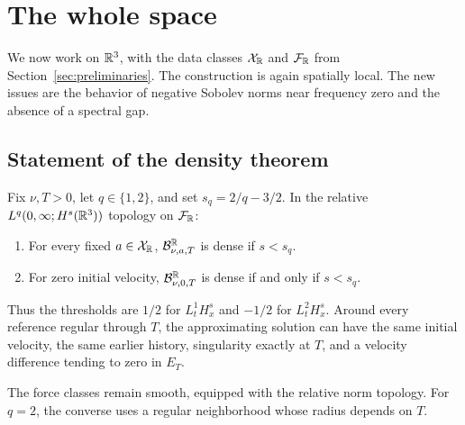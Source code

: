 \section{The whole space}\label{sec:whole}
We now work on $\mathbb R^3$, with the data classes $\mathcal X_{\mathbb R}$ and
$\mathcal F_{\mathbb R}$ from Section~\ref{sec:preliminaries}. The construction
is again spatially local. The new issues are the behavior of negative
Sobolev norms near frequency zero and the absence of a spectral gap.
\subsection{Statement of the density theorem}
\begin{theorem}\label{thm:Rmain}
Fix $\nu,T>0$, let $q\in\{1,2\}$, and set $s_q=2/q-3/2$. In the relative $L^q(0,\infty;H^s(\mathbb R^3))$ topology on $\mathcal F_{\mathbb R}$:
\begin{enumerate}[label=(\roman*),nosep]
\item For every fixed $a\in\mathcal X_{\mathbb R}$, $\mathcal B^\mathbb R_{\nu,a,T}$ is dense if $s<s_q$.
\item For zero initial velocity, $\mathcal B^\mathbb R_{\nu,0,T}$ is dense if and only if $s<s_q$.
\end{enumerate}
Thus the thresholds are $1/2$ for $L^1_tH^s_x$ and $-1/2$ for $L^2_tH^s_x$. Around every reference regular through $T$, the approximating solution can have the same initial velocity, the same earlier history, singularity exactly at $T$, and a velocity difference tending to zero in $E_T$.
\end{theorem}

The force classes remain smooth, equipped with the relative norm topology. For $q=2$, the converse uses a regular neighborhood whose radius depends on $T$.

